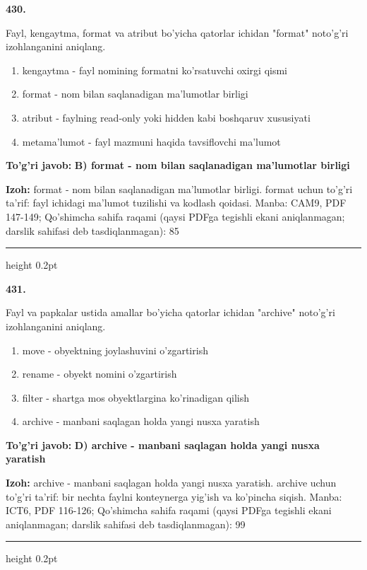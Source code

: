 \documentclass[10pt,a4paper]{article}
\begin{document}
{\bfseries\sffamily\color{ink} 430.}
\par
Fayl, kengaytma, format va atribut bo'yicha qatorlar ichidan "format" noto'g'ri izohlanganini aniqlang.
\begin{enumerate}[label=\Alph*),leftmargin=9mm]
\item kengaytma - fayl nomining formatni ko'rsatuvchi oxirgi qismi
\item format - nom bilan saqlanadigan ma'lumotlar birligi
\item atribut - faylning read-only yoki hidden kabi boshqaruv xususiyati
\item metama'lumot - fayl mazmuni haqida tavsiflovchi ma'lumot
\end{enumerate}
\begin{tcolorbox}[enhanced,breakable,colback=teal!4,colframe=teal!60!black,boxrule=0.45pt,arc=1.2mm,left=2.7mm,right=2.7mm,top=1.8mm,bottom=1.8mm,before skip=2mm,after skip=2mm]
{\bfseries\sffamily\color{teal}To'g'ri javob:} \textbf{B) format - nom bilan saqlanadigan ma'lumotlar birligi}
\par\smallskip
{\bfseries Izoh:} format - nom bilan saqlanadigan ma'lumotlar birligi. format uchun to'g'ri ta'rif: fayl ichidagi ma'lumot tuzilishi va kodlash qoidasi. Manba: CAM9, PDF 147-149; Qo'shimcha sahifa raqami (qaysi PDFga tegishli ekani aniqlanmagan; darslik sahifasi deb tasdiqlanmagan): 85
\end{tcolorbox}
\vspace{2mm}\hrule height 0.2pt\vspace{3mm}

{\bfseries\sffamily\color{ink} 431.}
\par
Fayl va papkalar ustida amallar bo'yicha qatorlar ichidan "archive" noto'g'ri izohlanganini aniqlang.
\begin{enumerate}[label=\Alph*),leftmargin=9mm]
\item move - obyektning joylashuvini o'zgartirish
\item rename - obyekt nomini o'zgartirish
\item filter - shartga mos obyektlargina ko'rinadigan qilish
\item archive - manbani saqlagan holda yangi nusxa yaratish
\end{enumerate}
\begin{tcolorbox}[enhanced,breakable,colback=teal!4,colframe=teal!60!black,boxrule=0.45pt,arc=1.2mm,left=2.7mm,right=2.7mm,top=1.8mm,bottom=1.8mm,before skip=2mm,after skip=2mm]
{\bfseries\sffamily\color{teal}To'g'ri javob:} \textbf{D) archive - manbani saqlagan holda yangi nusxa yaratish}
\par\smallskip
{\bfseries Izoh:} archive - manbani saqlagan holda yangi nusxa yaratish. archive uchun to'g'ri ta'rif: bir nechta faylni konteynerga yig'ish va ko'pincha siqish. Manba: ICT6, PDF 116-126; Qo'shimcha sahifa raqami (qaysi PDFga tegishli ekani aniqlanmagan; darslik sahifasi deb tasdiqlanmagan): 99
\end{tcolorbox}
\vspace{2mm}\hrule height 0.2pt\vspace{3mm}
\end{document}
